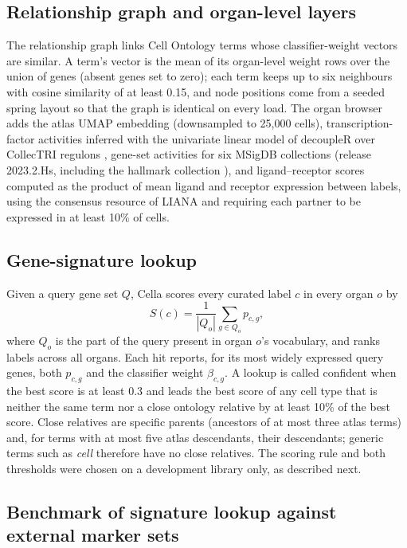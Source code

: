 \documentclass[11pt]{article}
\newcommand{\cella}{Cella}
\begin{document}
\subsection{Relationship graph and organ-level layers}

The relationship graph links Cell Ontology terms whose classifier-weight vectors are similar. A term's vector is the mean of its organ-level weight rows over the union of genes (absent genes set to zero); each term keeps up to six neighbours with cosine similarity of at least 0.15, and node positions come from a seeded spring layout so that the graph is identical on every load. The organ browser adds the atlas UMAP embedding (downsampled to 25{,}000 cells), transcription-factor activities inferred with the univariate linear model of decoupleR \cite{badia2022} over CollecTRI regulons \cite{mullerdott2023}, gene-set activities for six MSigDB collections (release 2023.2.Hs, including the hallmark collection \cite{liberzon2015}), and ligand--receptor scores computed as the product of mean ligand and receptor expression between labels, using the consensus resource of LIANA \cite{dimitrov2022} and requiring each partner to be expressed in at least 10\% of cells.

\subsection{Gene-signature lookup}

Given a query gene set $Q$, \cella{} scores every curated label $c$ in every organ $o$ by
\begin{equation}
S(c) = \frac{1}{|Q_o|} \sum_{g \in Q_o} p_{c,g},
\end{equation}
where $Q_o$ is the part of the query present in organ $o$'s vocabulary, and ranks labels across all organs. Each hit reports, for its most widely expressed query genes, both $p_{c,g}$ and the classifier weight $\beta_{c,g}$. A lookup is called confident when the best score is at least 0.3 and leads the best score of any cell type that is neither the same term nor a close ontology relative by at least 10\% of the best score. Close relatives are specific parents (ancestors of at most three atlas terms) and, for terms with at most five atlas descendants, their descendants; generic terms such as \emph{cell} therefore have no close relatives. The scoring rule and both thresholds were chosen on a development library only, as described next.

\subsection{Benchmark of signature lookup against external marker sets}
\end{document}
